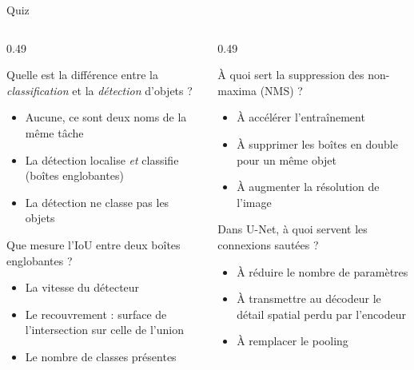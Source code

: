 \begin{frame}{Quiz}
\begin{columns}[t]
\begin{column}{0.49\textwidth}
\begin{qbox}[Question 1]
Quelle est la différence entre la \emph{classification} et la
\emph{détection} d'objets ?
\begin{itemize}
  \item[(a)] Aucune, ce sont deux noms de la même tâche
  \item[(b)] La détection localise \emph{et} classifie (boîtes englobantes)
  \item[(c)] La détection ne classe pas les objets
\end{itemize}
\end{qbox}
\begin{qbox}[Question 2]
Que mesure l'IoU entre deux boîtes englobantes ?
\begin{itemize}
  \item[(a)] La vitesse du détecteur
  \item[(b)] Le recouvrement : surface de l'intersection sur celle de l'union
  \item[(c)] Le nombre de classes présentes
\end{itemize}
\end{qbox}
\end{column}
\begin{column}{0.49\textwidth}
\begin{qbox}[Question 3]
À quoi sert la suppression des non-maxima (NMS) ?
\begin{itemize}
  \item[(a)] À accélérer l'entraînement
  \item[(b)] À supprimer les boîtes en double pour un même objet
  \item[(c)] À augmenter la résolution de l'image
\end{itemize}
\end{qbox}
\begin{qbox}[Question 4]
Dans U-Net, à quoi servent les connexions sautées ?
\begin{itemize}
  \item[(a)] À réduire le nombre de paramètres
  \item[(b)] À transmettre au décodeur le détail spatial perdu par l'encodeur
  \item[(c)] À remplacer le pooling
\end{itemize}
\end{qbox}
\end{column}
\end{columns}


\end{frame}
